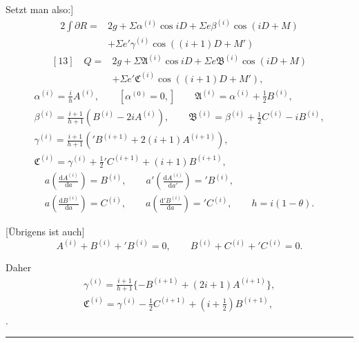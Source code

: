 Setzt man also:]
\[
\begin{aligned}
2\int\partial R={}&2g+\Sigma\alpha^{(i)}\cos iD+\Sigma e\beta^{(i)}\cos(iD+M)\\
&+\Sigma e'\gamma^{(i)}\cos((i+1)D+M')
\end{aligned}
\]
\[
\begin{aligned}
{}[13]\quad Q={}&2g+\Sigma\mathfrak{A}^{(i)}\cos iD+\Sigma e\mathfrak{B}^{(i)}\cos(iD+M)\\
&+\Sigma e'\mathfrak{C}^{(i)}\cos((i+1)D+M'),
\end{aligned}
\]
\[
\begin{gathered}
\alpha^{(i)}=\frac{i}{h}A^{(i)},\qquad[\alpha^{(0)}=0,]\qquad\mathfrak{A}^{(i)}=\alpha^{(i)}+\tfrac12 B^{(i)},\\[4pt]
\beta^{(i)}=\frac{i+1}{h+1}(B^{(i)}-2iA^{(i)}),\qquad\mathfrak{B}^{(i)}=\beta^{(i)}+\tfrac12 C^{(i)}-iB^{(i)},\\[4pt]
\gamma^{(i)}=\frac{i+1}{h+1}({}'B^{(i+1)}+2(i+1)A^{(i+1)}),\\
\mathfrak{C}^{(i)}=\gamma^{(i)}+\tfrac12{}'C^{(i+1)}+(i+1)B^{(i+1)},
\end{gathered}
\]
\[
\begin{gathered}
a\left(\frac{\mathrm{d}A^{(i)}}{\mathrm{d}a}\right)=B^{(i)},\qquad a'\left(\frac{\mathrm{d}A^{(i)}}{\mathrm{d}a'}\right)={}'B^{(i)},\\[4pt]
a\left(\frac{\mathrm{d}B^{(i)}}{\mathrm{d}a}\right)=C^{(i)},\qquad a\left(\frac{\mathrm{d}{}'B^{(i)}}{\mathrm{d}a}\right)={}'C^{(i)},\qquad h=i(1-\theta).
\end{gathered}
\]

[Übrigens ist auch]
\[A^{(i)}+B^{(i)}+{}'B^{(i)}=0,\qquad B^{(i)}+C^{(i)}+{}'C^{(i)}=0.\]

Daher
\[
\begin{gathered}
\gamma^{(i)}=\frac{i+1}{h+1}\{-B^{(i+1)}+(2i+1)A^{(i+1)}\},\\
\mathfrak{C}^{(i)}=\gamma^{(i)}-\tfrac12 C^{(i+1)}+(i+\tfrac12)B^{(i+1)},
\end{gathered}
\]
.
\par\medskip\noindent\rule{\linewidth}{.4pt}

\endgroup

